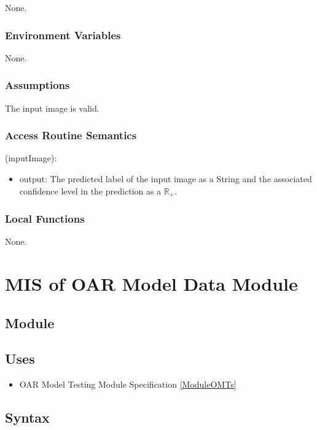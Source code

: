 \documentclass[12pt, titlepage]{article}
\begin{document}
None.

\subsubsection{Environment Variables}

None.

\subsubsection{Assumptions}

The input image is valid.

\subsubsection{Access Routine Semantics}

\noindent {}(inputImage):
\begin{itemize}
\item output: The predicted label of the input image  as a String and the associated confidence level in the 
prediction as a $\mathbb{R}_{+}$.
\end{itemize}

\subsubsection{Local Functions}

None.

\section{MIS of OAR Model Data Module} \label{ModuleOMD} 

\subsection{Module}


\subsection{Uses}

\begin{itemize}
  \item OAR Model Testing Module Specification \ref{ModuleOMTs}
\end{itemize}

\subsection{Syntax}
\end{document}
